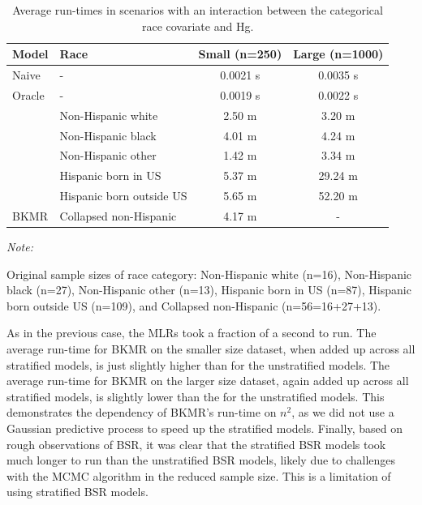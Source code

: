 \documentclass[12pt, twoside]{amherstthesis}
\begin{document}
\begin{table}

\caption{\label{tab:runtimesre}Average run-times in scenarios with an interaction between the categorical race covariate and Hg.}
\centering
\begin{threeparttable}
\begin{tabular}[t]{llcc}
\toprule
Model & Race & Small (n=250) & Large (n=1000)\\
\midrule
Naive & - & 0.0021 s & 0.0035 s\\
\addlinespace
Oracle & - & 0.0019 s & 0.0022 s\\
\addlinespace
 & Non-Hispanic white & 2.50 m & 3.20 m\\

 & Non-Hispanic black & 4.01 m & 4.24 m\\

 & Non-Hispanic other & 1.42 m & 3.34 m\\

 & Hispanic born in US & 5.37 m & 29.24 m\\

 & Hispanic born outside US & 5.65 m & 52.20 m\\

\multirow{-6}{*}{\raggedright\arraybackslash BKMR} & Collapsed non-Hispanic & 4.17 m & -\\
\bottomrule
\end{tabular}
\begin{tablenotes}
\item \textit{Note: } 
\item Original sample sizes of race category: Non-Hispanic white (n=16), Non-Hispanic black (n=27), Non-Hispanic other (n=13), Hispanic born in US (n=87), Hispanic born outside US (n=109), and Collapsed non-Hispanic (n=56=16+27+13).
\end{tablenotes}
\end{threeparttable}
\end{table}
As in the previous case, the MLRs took a fraction of a second to run. The average run-time for BKMR on the smaller size dataset, when added up across all stratified models, is just slightly higher than for the unstratified models. The average run-time for BKMR on the larger size dataset, again added up across all stratified models, is slightly lower than the for the unstratified models. This demonstrates the dependency of BKMR's run-time on \(n^2\), as we did not use a Gaussian predictive process to speed up the stratified models. Finally, based on rough observations of BSR, it was clear that the stratified BSR models took much longer to run than the unstratified BSR models, likely due to challenges with the MCMC algorithm in the reduced sample size. This is a limitation of using stratified BSR models.
\end{document}
